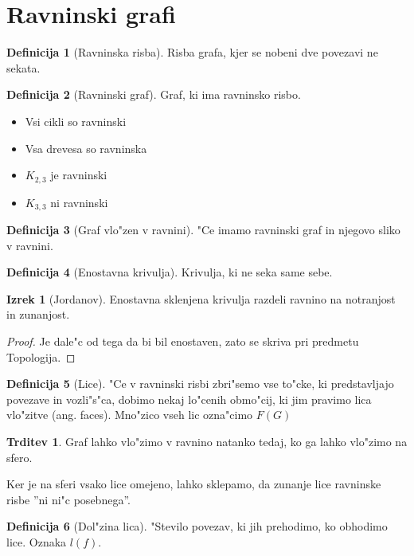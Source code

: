 \documentclass{article}
\theoremstyle{definition}
\newtheorem{definition}{Definicija}[section]
\newtheorem{claim}{Trditev}[section]
\newtheorem{theorem}{Izrek}[section]
\begin{document}
	\section{Ravninski grafi}
	\begin{definition}[Ravninska risba]
		Risba grafa, kjer se nobeni dve povezavi ne sekata.
	\end{definition}
	\begin{definition}[Ravninski graf]
		Graf, ki ima ravninsko risbo.
	\end{definition}

	\begin{itemize}
		\item Vsi cikli so ravninski
		\item Vsa drevesa so ravninska
		\item $K_{2,3}$ je ravninski
		\item $K_{3,3}$ ni ravninski
	\end{itemize}
		
	\begin{definition}[Graf vlo"zen v ravnini]
		"Ce imamo ravninski graf in njegovo sliko v ravnini.
	\end{definition}
	
	\begin{definition}[Enostavna krivulja]
		Krivulja, ki ne seka same sebe.
	\end{definition}
	\begin{theorem}[Jordanov]
		Enostavna sklenjena krivulja razdeli ravnino na notranjost in zunanjost.
		\begin{proof}
			Je dale"c od tega da bi bil enostaven, zato se skriva pri predmetu Topologija.
		\end{proof}
	\end{theorem}
	
	\begin{definition}[Lice]
		"Ce v ravninski risbi zbri"semo vse to"cke, ki predstavljajo povezave in vozli"s"ca, dobimo nekaj lo"cenih obmo"cij, ki jim pravimo lica vlo"zitve (ang. faces). Mno"zico vseh lic ozna"cimo $F(G)$
	\end{definition}
	
	\begin{claim}
		Graf lahko vlo"zimo v ravnino natanko tedaj, ko ga lahko vlo"zimo na sfero.
	\end{claim}
	Ker je na sferi vsako lice omejeno, lahko sklepamo, da zunanje lice ravninske risbe ''ni ni"c posebnega''.
	
	\begin{definition}[Dol"zina lica]
		"Stevilo povezav, ki jih prehodimo, ko obhodimo lice. Oznaka $l(f)$.
	\end{definition}
\end{document}
